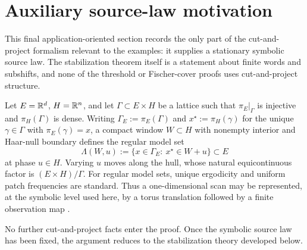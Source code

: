 \section{Auxiliary source-law motivation}\label{sec:superspace}

This final application-oriented section records the only part of the
cut-and-project formalism relevant to the examples: it supplies a stationary
symbolic source law. The stabilization theorem itself is a statement about
finite words and subshifts, and none of the threshold or Fischer-cover proofs
uses cut-and-project structure.

Let $E=\mathbb{R}^d$, $H=\mathbb{R}^n$, and let $\Gamma\subset E\times H$ be a lattice such that $\pi_E|_{\Gamma}$ is injective and $\pi_H(\Gamma)$ is dense. Writing $\Gamma_E:=\pi_E(\Gamma)$ and $x^\star:=\pi_H(\gamma)$ for the unique $\gamma\in\Gamma$ with $\pi_E(\gamma)=x$, a compact window $W\subset H$ with nonempty interior and Haar-null boundary defines the regular model set
\[
\Lambda(W,u):=\{x\in\Gamma_E:\ x^\star\in W+u\}\subset E
\]
at phase $u\in H$. Varying $u$ moves along the hull, whose natural equicontinuous factor is $(E\times H)/\Gamma$. For regular model sets, unique ergodicity and uniform patch frequencies are standard. Thus a one-dimensional scan may be represented, at the symbolic level used here, by a torus translation followed by a finite observation map \cite{Moody2000,BaakeGrimm2013}.

No further cut-and-project facts enter the proof. Once the symbolic source law has been fixed, the argument reduces to the stabilization theory developed below.
